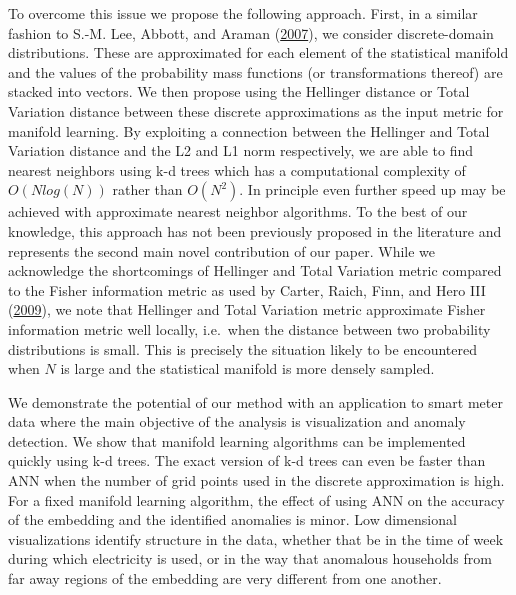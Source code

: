 \documentclass[12pt]{article}
\begin{document}
To overcome this issue we propose the following approach. First, in a similar fashion to S.-M. Lee, Abbott, and Araman (\protect\hyperlink{ref-lee2007}{2007}), we consider discrete-domain distributions. These are approximated for each element of the statistical manifold and the values of the probability mass functions (or transformations thereof) are stacked into vectors. We then propose using the Hellinger distance or Total Variation distance between these discrete approximations as the input metric for manifold learning. By exploiting a connection between the Hellinger and Total Variation distance and the L2 and L1 norm respectively, we are able to find nearest neighbors using k-d trees which has a computational complexity of \(O(Nlog(N))\) rather than \(O(N^2)\). In principle even further speed up may be achieved with approximate nearest neighbor algorithms. To the best of our knowledge, this approach has not been previously proposed in the literature and represents the second main novel contribution of our paper. While we acknowledge the shortcomings of Hellinger and Total Variation metric compared to the Fisher information metric as used by Carter, Raich, Finn, and Hero III (\protect\hyperlink{ref-carter2009}{2009}), we note that Hellinger and Total Variation metric approximate Fisher information metric well locally, i.e.~when the distance between two probability distributions is small. This is precisely the situation likely to be encountered when \(N\) is large and the statistical manifold is more densely sampled.

We demonstrate the potential of our method with an application to smart meter data where the main objective of the analysis is visualization and anomaly detection. We show that manifold learning algorithms can be implemented quickly using k-d trees. The exact version of k-d trees can even be faster than ANN when the number of grid points used in the discrete approximation is high. For a fixed manifold learning algorithm, the effect of using ANN on the accuracy of the embedding and the identified anomalies is minor. Low dimensional visualizations identify structure in the data, whether that be in the time of week during which electricity is used, or in the way that anomalous households from far away regions of the embedding are very different from one another.
\end{document}
